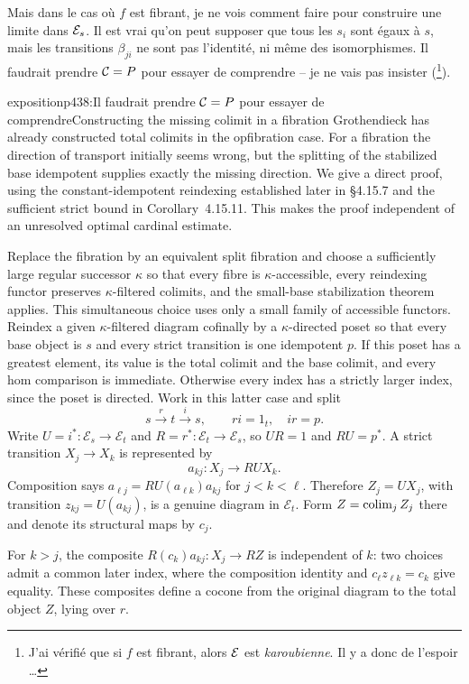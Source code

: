 Mais dans le cas où $f$ est fibrant, je ne vois comment faire pour construire une limite dans $\mathcal{E}_s$. Il est vrai qu'on peut supposer que tous les $s_i$ sont égaux à $s$, mais les transitions $\beta_{ji}$ ne sont pas l'identité, ni même des isomorphismes. Il faudrait prendre $\mathcal{C} = P$ pour essayer de comprendre -- je ne vais pas insister (\footnote[183]{J'ai vérifié que si $f$ est fibrant, alors $\mathcal{E}$ est \textit{karoubienne}. Il y a donc de l'espoir \dots}).

\begin{dcomment}{exposition}{p438:Il faudrait prendre $\mathcal{C} = P$ pour essayer de comprendre}{Constructing the missing colimit in a fibration}
Grothendieck has already constructed total colimits in the opfibration case. For a fibration the direction of transport initially seems wrong, but the splitting of the stabilized base idempotent supplies exactly the missing direction. We give a direct proof, using the constant-idempotent reindexing established later in \S4.15.7 and the sufficient strict bound in Corollary~4.15.11. This makes the proof independent of an unresolved optimal cardinal estimate.

Replace the fibration by an equivalent split fibration and choose a sufficiently large regular successor $\kappa$ so that every fibre is $\kappa$-accessible, every reindexing functor preserves $\kappa$-filtered colimits, and the small-base stabilization theorem applies. This simultaneous choice uses only a small family of accessible functors. Reindex a given $\kappa$-filtered diagram cofinally by a $\kappa$-directed poset so that every base object is $s$ and every strict transition is one idempotent $p$. If this poset has a greatest element, its value is the total colimit and the base colimit, and every hom comparison is immediate. Otherwise every index has a strictly larger index, since the poset is directed. Work in this latter case and split
\[
 s\xrightarrow{r}t\xrightarrow{i}s,
 \qquad ri=1_t,\quad ir=p.
\]
Write $U=i^*:\mathcal E_s\to\mathcal E_t$ and $R=r^*:\mathcal E_t\to\mathcal E_s$, so $UR=1$ and $RU=p^*$. A strict transition $X_j\to X_k$ is represented by
\[
 a_{kj}:X_j\longrightarrow RU X_k.
\]
Composition says $a_{\ell j}=RU(a_{\ell k})a_{kj}$ for $j<k<\ell$. Therefore $Z_j=UX_j$, with transition $z_{kj}=U(a_{kj})$, is a genuine diagram in $\mathcal E_t$. Form $Z=\mathop{\rm colim}_j Z_j$ there and denote its structural maps by $c_j$.

For $k>j$, the composite $R(c_k)a_{kj}:X_j\to RZ$ is independent of $k$: two choices admit a common later index, where the composition identity and $c_\ell z_{\ell k}=c_k$ give equality. These composites define a cocone from the original diagram to the total object $Z$, lying over $r$.


\end{dcomment}
